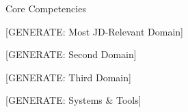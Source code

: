 \documentclass{resume}
\begin{document}
%
\begin{rSection}{Core Competencies}

\begin{skillgroup}{[GENERATE: Most JD-Relevant Domain]}
\skilldash{[GENERATE]}
\skilldash{[GENERATE]}
\skilldash{[GENERATE]}
\end{skillgroup}

\begin{skillgroup}{[GENERATE: Second Domain]}
\skilldash{[GENERATE]}
\skilldash{[GENERATE]}
\skilldash{[GENERATE]}
\end{skillgroup}

\begin{skillgroup}{[GENERATE: Third Domain]}
\skilldash{[GENERATE]}
\skilldash{[GENERATE]}
\skilldash{[GENERATE]}
\end{skillgroup}

\begin{skillgroup}{[GENERATE: Systems \& Tools]}
\skilldash{[GENERATE]}
\skilldash{[GENERATE]}
\end{skillgroup}

\end{rSection}
\vspace{-0.15cm}
\end{document}

